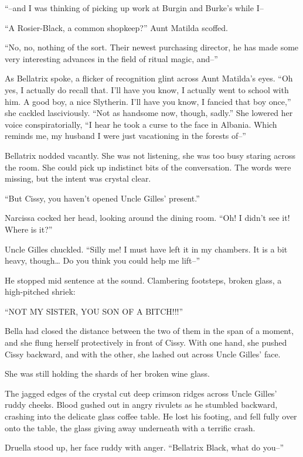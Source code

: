 “–and I was thinking of picking up work at Burgin and Burke’s while I–

“A Rosier-Black, a common shopkeep?” Aunt Matilda scoffed.

“No, no, nothing of the sort. Their newest purchasing director, he has made some very interesting advances in the field of ritual magic, and–”

As Bellatrix spoke, a flicker of recognition glint across Aunt Matilda’s eyes. “Oh yes, I actually do recall that. I’ll have you know, I actually went to school with him. A good boy, a nice Slytherin. I’ll have you know, I fancied that boy once,” she cackled lasciviously. “Not as handsome now, though, sadly.” She lowered her voice conspiratorially, “I hear he took a curse to the face in Albania. Which reminds me, my husband I were just vacationing in the forests of–”

Bellatrix nodded vacantly. She was not listening, she was too busy staring across the room. She could pick up indistinct bits of the conversation. The words were missing, but the intent was crystal clear.

“But Cissy, you haven’t opened Uncle Gilles’ present.”

Narcissa cocked her head, looking around the dining room. “Oh! I didn’t see it! Where is it?”

Uncle Gilles chuckled. “Silly me! I must have left it in my chambers. It is a bit heavy, though… Do you think you could help me lift–”

He stopped mid sentence at the sound. Clambering footsteps, broken glass, a high-pitched shriek:

“NOT MY SISTER, YOU SON OF A BITCH!!!”

Bella had closed the distance between the two of them in the span of a moment, and she flung herself protectively in front of Cissy. With one hand, she pushed Cissy backward, and with the other, she lashed out across Uncle Gilles’ face.

She was still holding the shards of her broken wine glass.

The jagged edges of the crystal cut deep crimson ridges across Uncle Gilles’ ruddy cheeks. Blood gushed out in angry rivulets as he stumbled backward, crashing into the delicate glass coffee table. He lost his footing, and fell fully over onto the table, the glass giving away underneath with a terrific crash.

Druella stood up, her face ruddy with anger. “Bellatrix Black, what do you–”


